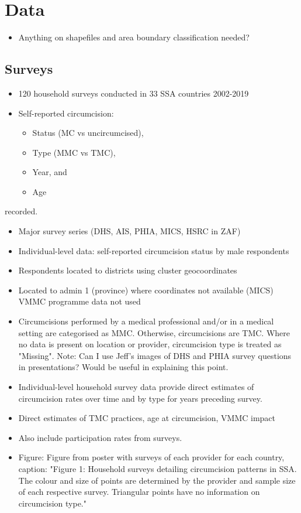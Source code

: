 \documentclass{article}
\begin{document}
\section*{Data}
\label{sec:org697fb8d}

\begin{itemize}
\item Anything on shapefiles and area boundary classification needed?
\end{itemize}

\subsection*{Surveys}
\label{sec:orgfecf39a}

\begin{itemize}
\item 120 household surveys conducted in 33 SSA countries 2002-2019
\item Self-reported circumcision:
\begin{itemize}
\item Status (MC vs uncircumcised),
\item Type (MMC vs TMC),
\item Year, and
\item Age
\end{itemize}
\end{itemize}
recorded.
\begin{itemize}
\item Major survey series (DHS, AIS, PHIA, MICS, HSRC in ZAF)
\item Individual-level data: self-reported circumcision status by male respondents
\item Respondents located to districts using cluster geocoordinates
\item Located to admin 1 (province) where coordinates not available (MICS)
VMMC programme data not used

\item Circumcisions performed by a medical professional and/or in a medical setting are categorised as MMC. Otherwise, circumcisions are TMC. Where no data is present on location or provider, circumcision type is treated as "Missing".
Note: Can I use Jeff's images of DHS and PHIA survey questions in presentations?
Would be useful in explaining this point.

\item Individual-level household survey data provide direct estimates of circumcision rates over time and by type for years preceding survey.

\item Direct estimates of TMC practices, age at circumcision, VMMC impact

\item Also include participation rates from surveys.

\item Figure: Figure from poster with surveys of each provider for each country, caption:
"Figure 1: Household surveys detailing circumcision patterns in SSA. The colour and size of points are determined by the provider and sample size of each respective survey. Triangular points have no information on circumcision type."
\end{itemize}
\end{document}
